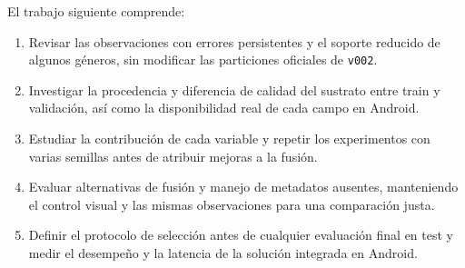 \documentclass[11pt,a4paper]{article}
\begin{document}
El trabajo siguiente comprende:
\begin{enumerate}
\item Revisar las observaciones con errores persistentes y el soporte reducido
de algunos géneros, sin modificar las particiones oficiales de \texttt{v002}.
\item Investigar la procedencia y diferencia de calidad del sustrato entre
train y validación, así como la disponibilidad real de cada campo en Android.
\item Estudiar la contribución de cada variable y repetir los experimentos
con varias semillas antes de atribuir mejoras a la fusión.
\item Evaluar alternativas de fusión y manejo de metadatos ausentes, manteniendo
el control visual y las mismas observaciones para una comparación justa.
\item Definir el protocolo de selección antes de cualquier evaluación final en
test y medir el desempeño y la latencia de la solución integrada en Android.
\end{enumerate}
\end{document}
